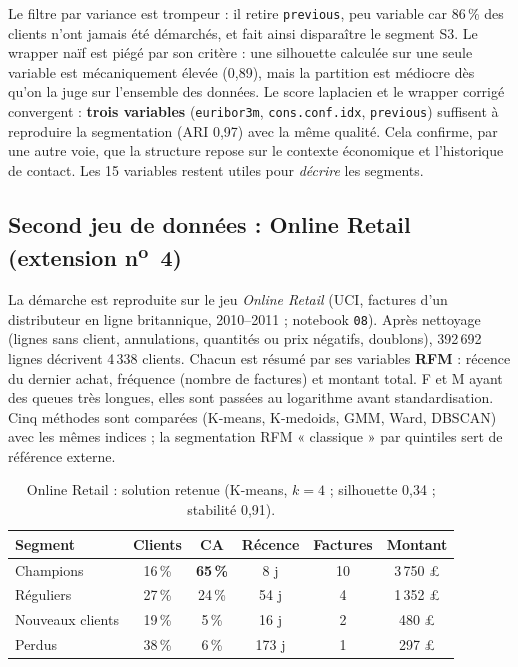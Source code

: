 \documentclass[11pt,a4paper]{article}
\begin{document}
Le filtre par variance est trompeur : il retire \texttt{previous}, peu variable car 86\,\% des clients n'ont jamais été démarchés, et fait ainsi disparaître le segment S3. Le wrapper naïf est piégé par son critère : une silhouette calculée sur une seule variable est mécaniquement élevée (0,89), mais la partition est médiocre dès qu'on la juge sur l'ensemble des données. Le score laplacien et le wrapper corrigé convergent : \textbf{trois variables} (\texttt{euribor3m}, \texttt{cons.conf.idx}, \texttt{previous}) suffisent à reproduire la segmentation (ARI 0,97) avec la même qualité. Cela confirme, par une autre voie, que la structure repose sur le contexte économique et l'historique de contact. Les 15 variables restent utiles pour \emph{décrire} les segments.

\subsection{Second jeu de données : Online Retail (extension n\textsuperscript{o}~4)}
La démarche est reproduite sur le jeu \emph{Online Retail} (UCI, factures d'un distributeur en ligne britannique, 2010--2011 ; notebook \texttt{08}). Après nettoyage (lignes sans client, annulations, quantités ou prix négatifs, doublons), 392\,692 lignes décrivent 4\,338 clients. Chacun est résumé par ses variables \textbf{RFM} : récence du dernier achat, fréquence (nombre de factures) et montant total. F et M ayant des queues très longues, elles sont passées au logarithme avant standardisation. Cinq méthodes sont comparées (K-means, K-medoids, GMM, Ward, DBSCAN) avec les mêmes indices ; la segmentation RFM « classique » par quintiles sert de référence externe.

\begin{table}[H]\centering\small
\caption{Online Retail : solution retenue (K-means, $k=4$ ; silhouette 0,34 ; stabilité 0,91).}\label{tab:rfm}
\begin{tabular}{|l|c|c|c|c|c|}
\hline
\textbf{Segment} & \textbf{Clients} & \textbf{CA} & \textbf{Récence} & \textbf{Factures} & \textbf{Montant}\\ \hline
Champions        & 16\,\% & \textbf{65\,\%} & 8 j   & 10 & 3\,750 £\\ \hline
Réguliers        & 27\,\% & 24\,\% & 54 j  & 4  & 1\,352 £\\ \hline
Nouveaux clients & 19\,\% & 5\,\%  & 16 j  & 2  & 480 £\\ \hline
Perdus           & 38\,\% & 6\,\%  & 173 j & 1  & 297 £\\ \hline
\end{tabular}
\end{table}
\end{document}
